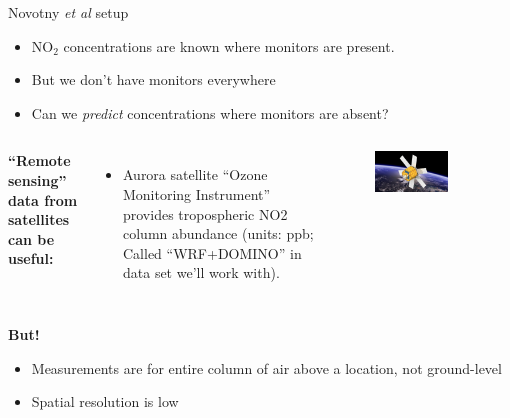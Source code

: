 \documentclass[aspectratio=169]{beamer}
\begin{document}
\begin{frame}{Novotny \textit{et al} setup}

\begin{itemize}
\item NO$_2$ concentrations are known where monitors are present.  
\item But we don't have monitors everywhere
\item Can we \textit{predict} concentrations where monitors are absent?
\end{itemize}

\pause
\begin{columns}
\textbf{``Remote sensing'' data from satellites can be useful:}
\begin{itemize}
\item Aurora satellite ``Ozone Monitoring Instrument'' provides tropospheric NO2 column abundance (units: ppb; Called ``WRF+DOMINO'' in data set we'll work with).
\end{itemize}

\begin{figure}
\includegraphics[width=0.75\textwidth]{aurora}
\caption*{}
\end{figure}
\end{columns}


\pause
\textbf{But!}
\begin{itemize}
\item Measurements are for entire column of air above a location, not ground-level
\item Spatial resolution is low
\end{itemize}

\end{frame}
\end{document}
